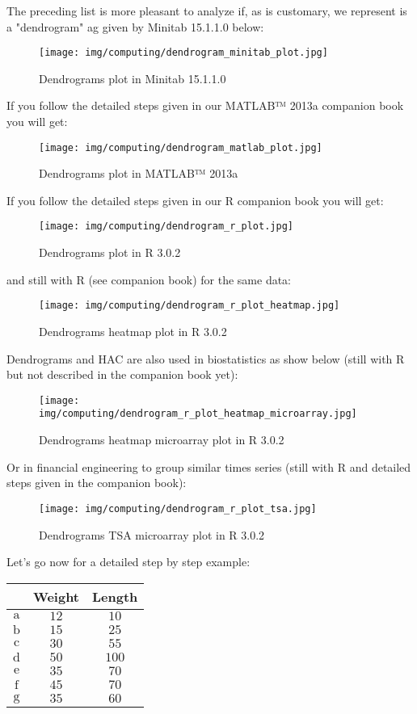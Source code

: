 	The preceding list is more pleasant to analyze if, as is customary, we represent is a "dendrogram" ag given by Minitab 15.1.1.0 below:	
	\begin{figure}[H]
		\centering
		\texttt{[image: img/computing/dendrogram\_minitab\_plot.jpg]}
		\caption{Dendrograms plot in Minitab 15.1.1.0}
	\end{figure}
	If you follow the detailed steps given in our MATLAB™ 2013a companion book you will get:
	\begin{figure}[H]
		\centering
		\texttt{[image: img/computing/dendrogram\_matlab\_plot.jpg]}
		\caption{Dendrograms plot in MATLAB™ 2013a }
	\end{figure}
	If you follow the detailed steps given in our R companion book you will get:
	\begin{figure}[H]
		\centering
		\texttt{[image: img/computing/dendrogram\_r\_plot.jpg]}
		\caption{Dendrograms plot in R 3.0.2}
	\end{figure}
	and still with R (see companion book) for the same data:
	\begin{figure}[H]
		\centering
		\texttt{[image: img/computing/dendrogram\_r\_plot\_heatmap.jpg]}
		\caption{Dendrograms heatmap plot in R 3.0.2}
	\end{figure}
	Dendrograms and HAC are also used in biostatistics as show below (still with R but not described in the companion book yet):
	\begin{figure}[H]
		\centering
		\texttt{[image: img/computing/dendrogram\_r\_plot\_heatmap\_microarray.jpg]}
		\caption{Dendrograms heatmap microarray plot in R 3.0.2}
	\end{figure}
	Or in financial engineering to group similar times series (still with R and detailed steps given in the companion book):
	\begin{figure}[H]
		\centering
		\texttt{[image: img/computing/dendrogram\_r\_plot\_tsa.jpg]}
		\caption{Dendrograms TSA microarray plot in R 3.0.2}
	\end{figure}
	Let's go now for a detailed step by step example:
	\begin{table}[H]
		\centering
		\begin{tabular}{|c|c|c|}
		\hline
		\rowcolor[HTML]{9B9B9B} 
		\multicolumn{1}{|l|}{\cellcolor[HTML]{9B9B9B}\textbf{Object}} & \multicolumn{1}{l|}{\cellcolor[HTML]{9B9B9B}\textbf{Weight}} & \multicolumn{1}{l|}{\cellcolor[HTML]{9B9B9B}\textbf{Length}} \\ \hline
		$\mathrm{a}$ & $12$ & $10$ \\ \hline
		$\mathrm{b}$ & $15$ & $25$ \\ \hline
		$\mathrm{c}$ & $30$ & $55$ \\ \hline
		$\mathrm{d}$ & $50$ & $100$ \\ \hline
		$\mathrm{e}$ & $35$ & $70$ \\ \hline
		$\mathrm{f}$ & $45$ & $70$ \\ \hline
		$\mathrm{g}$ & $35$ & $60$ \\ \hline
		\end{tabular}
	\end{table}
